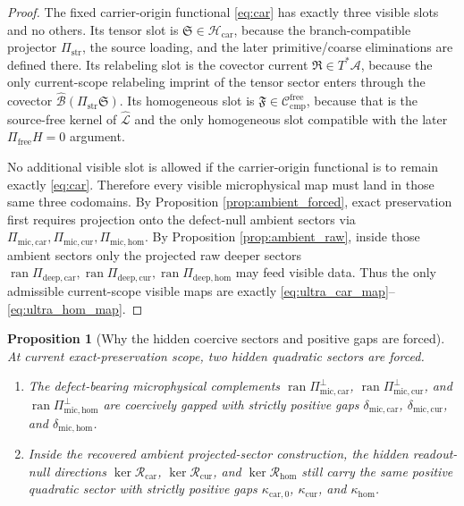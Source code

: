 \documentclass[11pt]{article}
\newcommand{\Sub}{\mathcal A}
\newcommand{\SubGaugeVec}{\widehat{\mathcal B}}
\newcommand{\SubReducedEin}{\widehat{\mathcal L}}
\newcommand{\CompFree}{\mathscr C_{\mathrm{cmp}}^{\mathrm{free}}}
\newcommand{\CarrierClass}{\mathscr H_{\mathrm{car}}}
\newcommand{\CarrierProj}{\Pi_{\mathrm{str}}}
\newcommand{\CarrierSeed}{\mathfrak S}
\newcommand{\RelabelSeed}{\mathfrak R}
\newcommand{\FreeSeed}{\mathfrak F}
\newcommand{\PreCarGap}{\kappa_{\mathrm{car},0}}
\newcommand{\CurrentGap}{\kappa_{\mathrm{cur}}}
\newcommand{\HomGap}{\kappa_{\mathrm{hom}}}
\newcommand{\CarRead}{\mathcal R_{\mathrm{car}}}
\newcommand{\CurRead}{\mathcal R_{\mathrm{cur}}}
\newcommand{\HomRead}{\mathcal R_{\mathrm{hom}}}
\newcommand{\ProtoCarProj}{\Pi_{\mathrm{deep,car}}}
\newcommand{\ProtoCurProj}{\Pi_{\mathrm{deep,cur}}}
\newcommand{\ProtoHomProj}{\Pi_{\mathrm{deep,hom}}}
\newcommand{\UltraCarProj}{\Pi_{\mathrm{mic,car}}}
\newcommand{\UltraCurProj}{\Pi_{\mathrm{mic,cur}}}
\newcommand{\UltraHomProj}{\Pi_{\mathrm{mic,hom}}}
\newcommand{\UltraCarPerp}{\Pi_{\mathrm{mic,car}}^{\perp}}
\newcommand{\UltraCurPerp}{\Pi_{\mathrm{mic,cur}}^{\perp}}
\newcommand{\UltraHomPerp}{\Pi_{\mathrm{mic,hom}}^{\perp}}
\newcommand{\UltraCarGap}{\delta_{\mathrm{mic,car}}}
\newcommand{\UltraCurGap}{\delta_{\mathrm{mic,cur}}}
\newcommand{\UltraHomGap}{\delta_{\mathrm{mic,hom}}}
\newtheorem{proposition}{Proposition}
\begin{document}
\begin{proof}
The fixed carrier-origin functional \eqref{eq:car} has exactly three visible slots and no others. Its tensor slot is \(\CarrierSeed\in\CarrierClass\), because the branch-compatible projector \(\CarrierProj\), the source loading, and the later primitive/coarse eliminations are defined there. Its relabeling slot is the covector current \(\RelabelSeed\in T^*\Sub\), because the only current-scope relabeling imprint of the tensor sector enters through the covector \(\SubGaugeVec(\CarrierProj\CarrierSeed)\). Its homogeneous slot is \(\FreeSeed\in\CompFree\), because that is the source-free kernel of \(\SubReducedEin\) and the only homogeneous slot compatible with the later \(\Pi_{\mathrm{free}}H=0\) argument.

No additional visible slot is allowed if the carrier-origin functional is to remain exactly \eqref{eq:car}. Therefore every visible microphysical map must land in those same three codomains. By Proposition \ref{prop:ambient_forced}, exact preservation first requires projection onto the defect-null ambient sectors via \(\UltraCarProj,\UltraCurProj,\UltraHomProj\). By Proposition \ref{prop:ambient_raw}, inside those ambient sectors only the projected raw deeper sectors \(\operatorname{ran}\ProtoCarProj,\operatorname{ran}\ProtoCurProj,\operatorname{ran}\ProtoHomProj\) may feed visible data. Thus the only admissible current-scope visible maps are exactly \eqref{eq:ultra_car_map}--\eqref{eq:ultra_hom_map}.
\end{proof}

\begin{proposition}[Why the hidden coercive sectors and positive gaps are forced]
\label{prop:kernelquadratic}
At current exact-preservation scope, two hidden quadratic sectors are forced.
\begin{enumerate}
    \item The defect-bearing microphysical complements \(\operatorname{ran}\UltraCarPerp\), \(\operatorname{ran}\UltraCurPerp\), and \(\operatorname{ran}\UltraHomPerp\) are coercively gapped with strictly positive gaps \(\UltraCarGap\), \(\UltraCurGap\), and \(\UltraHomGap\).
    \item Inside the recovered ambient projected-sector construction, the hidden readout-null directions \(\ker\CarRead\), \(\ker\CurRead\), and \(\ker\HomRead\) still carry the same positive quadratic sector with strictly positive gaps \(\PreCarGap\), \(\CurrentGap\), and \(\HomGap\).
\end{enumerate}
\end{proposition}
\end{document}

